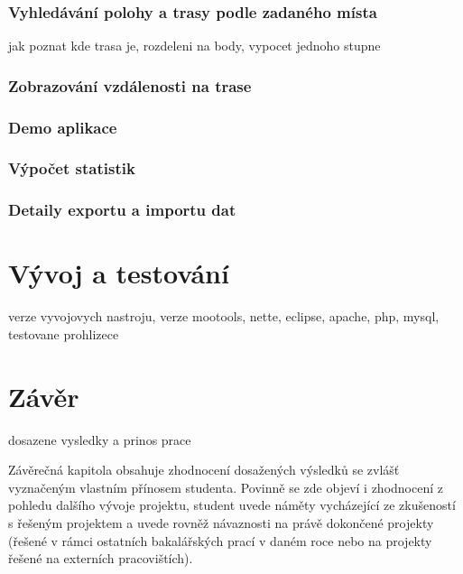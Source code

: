\subsection{Vyhledávání polohy a trasy podle zadaného místa}
jak poznat kde trasa je, rozdeleni na body, vypocet jednoho stupne

\subsection{Zobrazování vzdálenosti na trase}

\subsection{Demo aplikace}

\subsection{Výpočet statistik}

\subsection{Detaily exportu a importu dat}

\chapter{Vývoj a testování}
verze vyvojovych nastroju, verze mootools, nette, eclipse, apache,
php, mysql, testovane prohlizece

\chapter*{Závěr}
dosazene vysledky a prinos prace

Závěrečná kapitola obsahuje zhodnocení dosažených výsledků se zvlášť
vyznačeným vlastním přínosem studenta. Povinně se zde objeví i
zhodnocení z pohledu dalšího vývoje projektu, student uvede náměty
vycházející ze zkušeností s řešeným projektem a uvede rovněž
návaznosti na právě dokončené projekty (řešené v rámci ostatních
bakalářských prací v daném roce nebo na projekty řešené na externích
pracovištích).
